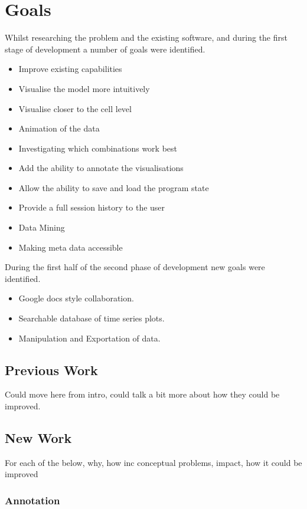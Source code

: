 \section{Goals}

Whilst researching the problem and the existing software, and during the first stage of development a number of goals were identified.

\begin{itemize}
\item Improve existing capabilities
\item Visualise the model more intuitively
\item Visualise closer to the cell level
\item Animation of the data
\item Investigating which combinations work best
\item Add the ability to annotate the visualisations
\item Allow the ability to save and load the program state
\item Provide a full session history to the user
\item Data Mining
\item Making meta data accessible
\end{itemize}

During the first half of the second phase of development new goals were identified.

\begin{itemize}
\item Google docs style collaboration.
\item Searchable database of time series plots.
\item Manipulation and Exportation of data.
\end{itemize}

\subsection{Previous Work}
Could move here from intro, could talk a bit more about how they could be improved.

\subsection{New Work}

For each of the below, why, how inc conceptual problems, impact, how it could be improved

\subsubsection{Annotation}

